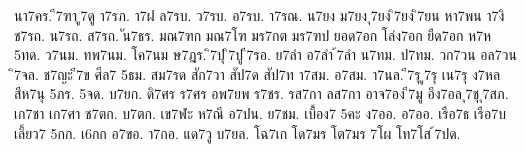 {นา7คร.
ี7ฑา
ู7ดู
า7รภ.
า7ฝ
ล7รบ.
ว7รบ.
อ7รบ.
า7รณ.
น7ยง
ม7ยง
ุ7ยง
ิ7ยง
ิ7ยน
หา7พน
า7งิ
ช7รถ.
น7รถ.
ส7รถ.
ัน7ธร.
มณ7ฑก
มณ7โฑ
มร7กต
มร7ฑป
ยอด7อก
โล่ง7อก
ยืด7อก
ห7ห
5ทด.
ว7นม.
ทพ7นม.
โค7นม
ษ7ฎร.
ิ7ปุ
ิ7ปู
ี7รอ.
ย7ลำ
อ7ลำ
้7ลำ
น7ทม.
ป7ทม.
วก7วน
อล7วน
ิ7จล.
ช7ญะ
ี7ข
ศีล7
5ธม.
สม7รด
สัก7วา
สัป7ด
สัป7ท
า7สม.
อ7สม.
า7นล.
ี7รุ
ู7รุ
เน7รุ
ง7หล
สีห7นุ
5ภร.
5จด.
บ7ยก.
ดิ7ศร
ร7ศร
อพ7ยพ
ร7ชร.
รส7กา
ลส7กา
อาจ7อง
ี7มู
อึง7อล
ุ7ชุ
ุ7สภ.
เก7ชา
เก7ศา
ช7ตก.
บ7ตก.
เข7ฬะ
ห7ณี
อ7ปน.
ย7ชม.
เบื้อง7
5คะ
ง7ออ.
อ7ออ.
เรือ7ธ
เรือ7บ
เลี้ยว7
5กก.
เ6กก
อ7ขอ.
า7กอ.
แด7วู
บ7ยล.
โฉ7เก
โด7มร
โต7มร
7โผ
โท7โส
้7ปด.
}
